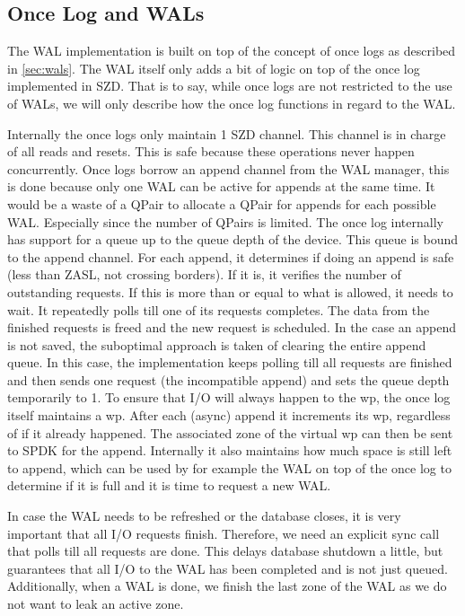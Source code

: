 \subsection{Once Log and WALs}
The WAL implementation is built on top of the concept of once logs as described in \autoref{sec:wals}. The WAL itself only adds a bit of logic on top of the once log implemented in SZD. That is to say, while once logs are not restricted to the use of WALs, we will only describe how the once log functions in regard to the WAL.

Internally the once logs only maintain 1 SZD channel. This channel is in charge of all reads and resets. This is safe because these operations never happen concurrently. Once logs borrow an append channel from the WAL manager, this is done because only one WAL can be active for appends at the same time. It would be a waste of a QPair to allocate a QPair for appends for each possible WAL. Especially since the number of QPairs is limited. The once log internally has support for a queue up to the queue depth of the device. This queue is bound to the append channel. For each append, it determines if doing an append is safe (less than ZASL, not crossing borders). If it is, it verifies the number of outstanding requests. If this is more than or equal to what is allowed, it needs to wait. It repeatedly polls till one of its requests completes. The data from the finished requests is freed and the new request is scheduled. In the case an append is not saved, the suboptimal approach is taken of clearing the entire append queue. In this case, the implementation keeps polling till all requests are finished and then sends one request (the incompatible append) and sets the queue depth temporarily to 1. To ensure that I/O will always happen to the wp, the once log itself maintains a wp. After each (async) append it increments its wp, regardless of if it already happened. The associated zone of the virtual wp can then be sent to SPDK for the append. Internally it also maintains how much space is still left to append, which can be used by for example the WAL on top of the once log to determine if it is full and it is time to request a new WAL.

In case the WAL needs to be refreshed or the database closes, it is very important that all I/O requests finish. Therefore, we need an explicit sync call that polls till all requests are done. This delays database shutdown a little, but guarantees that all I/O to the WAL has been completed and is not just queued. Additionally, when a WAL is done, we finish the last zone of the WAL as we do not want to leak an active zone.

